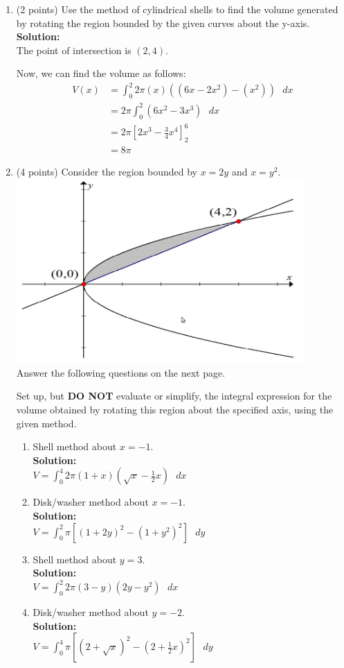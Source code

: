 \documentclass[paper=a4, fontsize=11pt]{scrartcl} %
\numberwithin{equation}{section} %
\numberwithin{figure}{section} %
\numberwithin{table}{section} %
\begin{document}
\begin{enumerate}
\item (2 points) Use the method of cylindrical shells to find the volume generated by rotating the region bounded by the given curves about the y-axis.\\

\noindent\textbf{Solution:}\\
The point of intersection is $(2,4)$.

Now, we can find the volume as follows:
\begin{align*}
V(x) &= \int_0^2 2 \pi (x) \left( (6x-2x^2)-(x^2) \right)  \text{  } dx \\
&= 2 \pi \int_0^2  \left( 6x^2-3x^3 \right)  \text{  } dx \\
&= 2 \pi \left[ 2x^3 - \frac{3}{4}x^4 \right]_2^6\\
&= 8 \pi
\end{align*}
\newpage
\item (4 points) Consider the region bounded by $x=2y$ and $x=y^2$.\\
\includegraphics[width=11cm]{IC2_4}\\
Answer the following questions on the next page. 

Set up, but \textbf{DO NOT} evaluate or simplify, the integral expression for the volume obtained by rotating this region about the specified axis, using the given method.\\
\begin{enumerate}
\item Shell method about $x=-1$.\\
\noindent\textbf{Solution:}\\
$ V = \int_0^4 2 \pi (1+x) \left( \sqrt{x} - \frac{1}{2}x \right) \text{  } dx$
\item Disk/washer method about $x=-1$.\\
\noindent\textbf{Solution:}\\
$V =\int_0^2 \pi \left[ (1+2y)^2 - (1+y^2)^2 \right] \text{  } dy$
\item Shell method about $y=3$.\\
\noindent\textbf{Solution:}\\
$V =\int_0^2 2 \pi (3-y)(2y-y^2) \text{  } dx$
\item Disk/washer method about $y=-2$.\\
\noindent\textbf{Solution:}\\
$V = \int_0^4  \pi  \left[ (2+\sqrt{x})^2 - \left (2+\frac{1}{2}x \right)^2 \right] \text{  } dy$
\end{enumerate}





\end{enumerate}
\end{document}
